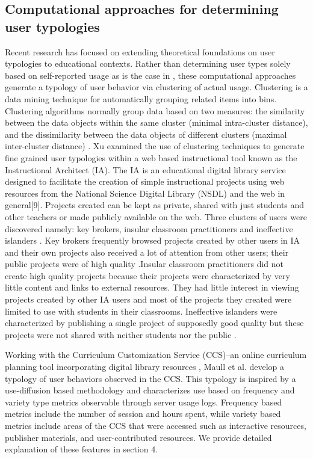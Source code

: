 \documentclass{acm_proc_article-sp}
\begin{document}
\subsection{Computational approaches for determining user typologies}
Recent research has focused on extending theoretical foundations on user typologies to educational contexts. Rather than determining user types solely based on self-reported usage as is the case in \cite{shih2004beyond,ram1990conceptualization}, these computational approaches generate a typology of user behavior via clustering of actual usage. Clustering is a data mining technique for automatically grouping related items into bins. Clustering algorithms normally group data based on two measures: the similarity between the data objects within the same cluster (minimal intra-cluster distance), and the dissimilarity between the data objects of different clusters (maximal inter-cluster distance) \cite{han2006data}. Xu \cite{xu} examined the use of clustering techniques to generate fine grained user typologies within a web based instructional tool known as the Instructional Architect (IA). The IA is an educational digital library service designed to facilitate the creation of simple instructional projects using web resources from the National Science Digital Library (NSDL) and the web in general[9]. Projects created can be kept as private, shared with just students and other teachers or made publicly available on the web. Three clusters of users were discovered namely: key brokers, insular classroom practitioners and ineffective islanders \cite{xu}.  Key brokers frequently browsed projects created by other users in IA and their own projects also received a lot of attention from other users; their public projects were of high quality \cite{xu}.Insular classroom practitioners did not create high quality projects because their projects were characterized by very little content and links to external resources. They had little interest in viewing projects created by other IA users and most of the projects they created were limited to use with students in their classrooms. Ineffective islanders were characterized by publishing a single project of supposedly good quality but these projects were not shared with neither students nor the public \cite{xu}.

Working with the Curriculum Customization Service (CCS)--an online curriculum planning tool incorporating digital library resources \cite{sumner:team}, Maull et al. \cite{maullunderstanding} develop a typology of user behaviors observed in the CCS. This typology is inspired by a use-diffusion based  methodology and characterizes use based on  frequency and variety type metrics observable through server usage logs. Frequency based metrics include the number of session and hours spent, while variety based metrics include areas of the CCS that were accessed such as interactive resources, publisher materials, and user-contributed resources. We provide detailed explanation of these features in section 4. 
\end{document}
